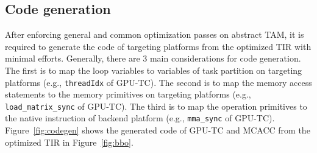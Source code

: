 %

\subsection{Code generation}

After enforcing general and common optimization passes on abstract TAM, it is required to generate the code of targeting platforms from the optimized TIR with minimal efforts. %
Generally, there are $3$ main considerations for code generation. The first is to map the loop variables to variables of task partition on targeting platforms (e.g., \texttt{threadIdx} of GPU-TC). The second is to map the memory access statements to the memory primitives on targeting platforms (e.g., \texttt{load\_matrix\_sync} of GPU-TC). The third is to map the operation primitives to the native instruction of backend platform (e.g., \texttt{mma\_sync} of GPU-TC). Figure~\ref{fig:codegen} shows the generated code of GPU-TC and MCACC from the optimized TIR in Figure~\ref{fig:bbo}.

